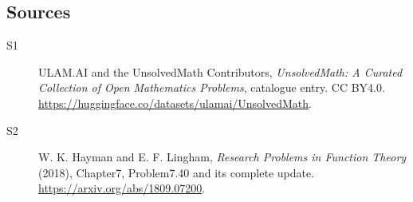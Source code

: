 \documentclass[11pt]{article}
\begin{document}
\subsection{Sources}
\begin{description}
\item[\hypertarget{source:statement:1}{S1}] ULAM.AI and the UnsolvedMath Contributors, \emph{UnsolvedMath: A Curated Collection of Open Mathematics Problems}, catalogue entry. CC BY4.0. \url{https://huggingface.co/datasets/ulamai/UnsolvedMath}.
\item[\hypertarget{source:statement:2}{S2}] W. K. Hayman and E. F. Lingham, \emph{Research Problems in Function Theory} (2018), Chapter7, Problem7.40 and its complete update. \url{https://arxiv.org/abs/1809.07200}.
\end{description}
\label{end:statement}
\end{document}
